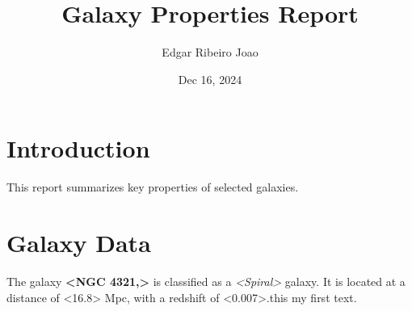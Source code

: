 \documentclass{article}
\title{Galaxy Properties Report}
\author{Edgar Ribeiro Joao}
\date{Dec 16, 2024}
\begin{document}
\maketitle

\section{Introduction}
This report summarizes key properties of selected galaxies.

\section{Galaxy Data}
The galaxy \textbf{<NGC 4321,>} is classified as a \textit{<Spiral>} galaxy. 
It is located at a distance of <16.8> Mpc, with a redshift of <0.007>.this my first text.
\end{document}
